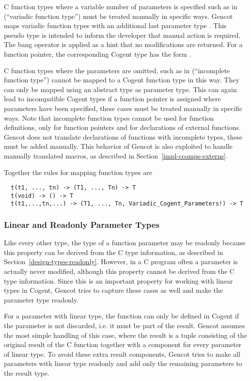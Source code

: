 C function types where a variable number of
parameters is specified such as in  (``variadic function type'') must 
be treated manually in specific ways. Gencot maps variadic function types
with an additional last parameter type . This pseudo type is intended 
to inform the developer that manual action is required. The bang operator is applied as a hint
that no modifications are returned. For a function pointer, the corresponding Cogent type has
the form .

C function types where the parameters are omitted, such as in  (``incomplete function type'') 
cannot be mapped to a Cogent function type in this way. 
They can only be mapped using an abstract type as parameter type. This can again lead to incompatible 
Cogent types if a function pointer is assigned where parameters have been specified, these cases must 
be treated manually in specific ways. Note that incomplete function types cannot be used for function
definitions, only for function pointers and for declarations of external functions. 
Gencot does not translate declarations of functions with incomplete types, these must be added manually.
This behavior of Gencot is also exploited to handle manually translated macros, as described in 
Section~\ref{impl-ccomps-externs}.

Together the rules for mapping function types are
\begin{verbatim}
  t(t1, ..., tn) -> (T1, ..., Tn) -> T
  t(void) -> () -> T
  t(t1,...,tn,...) -> (T1, ..., Tn, Variadic_Cogent_Parameters!) -> T
\end{verbatim}

\subsubsection{Linear and Readonly Parameter Types}

Like every other type, the type of a function parameter may be readonly because this property can be derived
from the C type information, as described in Section~\ref{design-types-readonly}. However, in a C program 
often a parameter is actually never modified, although this property cannot be derived from the C type information.
Since this is an important property for working with linear types in Cogent, Gencot tries to capture these
cases as well and make the parameter type readonly.

For a parameter with linear type, the function can only be defined in Cogent if the parameter is not discarded,
i.e. it must be part of the result. Gencot assumes the most simple handling of this case, where the result
is a tuple consisting of the original result of the C function together with a component for every parameter
of linear type. To avoid these extra result components, Gencot tries to make all parameters with linear type
readonly and add only the remaining parameters to the result type.

